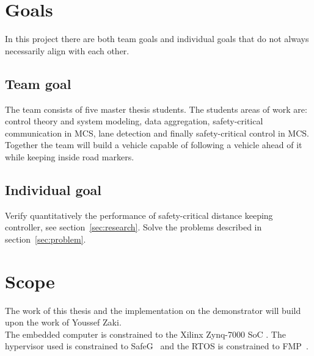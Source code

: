 \section{Goals}
In this project there are both team goals and individual goals that do not always necessarily align with each other.

\subsection{Team goal}
The team consists of five master thesis students. The students areas of work are: control theory and system modeling, data aggregation, safety-critical communication in MCS, lane detection and finally safety-critical control in MCS. Together the team will build a vehicle capable of following a vehicle ahead of it while keeping inside road markers.

\subsection{Individual goal}
Verify quantitatively the performance of safety-critical distance keeping controller, see section~\ref{sec:research}. Solve the problems described in section~\ref{sec:problem}.

\section{Scope}
\label{sec:scope}
The work of this thesis and the implementation on the demonstrator will build upon the work of Youssef Zaki\cite{zaki2016}.\\

The embedded computer is constrained to the Xilinx Zynq-7000 SoC \cite{website:xilinx}. The hypervisor used is constrained to SafeG~\cite{website:safeg} and the RTOS is constrained to FMP~\cite{website:fmp}. 




